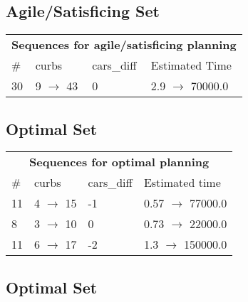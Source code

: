 \documentclass{article}
\begin{document}
                         \subsection*{Agile/Satisficing Set}

                        \begin{center}
                        \begin{tabular}{l|l|l|l}
                        \multicolumn{4}{c}{\bf \large Sequences for agile/satisficing planning}\\
                        \# & curbs & cars\_diff & Estimated Time\\\midrule
                        30&9 $\rightarrow$ 43&0&2.9 $\rightarrow$ 70000.0
                        \end{tabular}
                        \end{center}
                    
                            \subsection*{Optimal Set}

                            \begin{center}
                            \begin{tabular}{l|l|l|l}
                            \multicolumn{4}{c}{\bf \large Sequences for optimal planning}\\
                            \# & curbs & cars\_diff & Estimated time\\\midrule
                            11&4 $\rightarrow$ 15&-1&0.57 $\rightarrow$ 77000.0\\
8&3 $\rightarrow$ 10&0&0.73 $\rightarrow$ 22000.0\\
11&6 $\rightarrow$ 17&-2&1.3 $\rightarrow$ 150000.0
                            \end{tabular}
                            \end{center}
                    
                                \subsection*{Optimal Set}
                                
\end{document}

